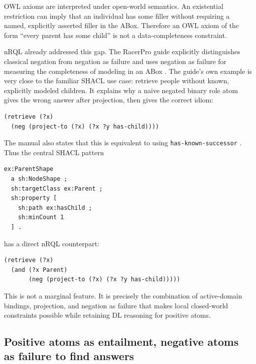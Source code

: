 \documentclass[11pt,letterpaper]{article}
\newcommand{\nrql}{nRQL}
\newcommand{\shacl}{SHACL}
\newcommand{\naf}{negation as failure}
\newcommand{\abox}{ABox}
\newcommand{\owl}{OWL}
\begin{document}
\owl{} axioms are interpreted under open-world semantics. An existential restriction can imply that an individual has some filler without requiring a named, explicitly asserted filler in the \abox{}. Therefore an \owl{} axiom of the form ``every parent has some child'' is not a data-completeness constraint.

\nrql{} already addressed this gap. The RacerPro guide explicitly distinguishes classical negation from \naf{} and uses \naf{} for measuring the completeness of modeling in an \abox{} \cite[pp.~113--116]{racerug}. The guide's own example is very close to the familiar \shacl{} use case: retrieve people without known, explicitly modeled children. It explains why a naive negated binary role atom gives the wrong answer after projection, then gives the correct idiom:

\begin{lstlisting}[language=nrql,caption={nRQL idiom for missing known successors.}]
(retrieve (?x)
  (neg (project-to (?x) (?x ?y has-child))))
\end{lstlisting}

The manual also states that this is equivalent to using \texttt{has-known-successor} \cite[pp.~115--116,119--120]{racerug}. Thus the central \shacl{} pattern

\begin{lstlisting}[language=turtle,caption={SHACL idiom for the same missing-successor constraint.}]
ex:ParentShape
  a sh:NodeShape ;
  sh:targetClass ex:Parent ;
  sh:property [
    sh:path ex:hasChild ;
    sh:minCount 1
  ] .
\end{lstlisting}

has a direct \nrql{} counterpart:

\begin{lstlisting}[language=nrql,caption={nRQL violation query for the parent example.}]
(retrieve (?x)
  (and (?x Parent)
       (neg (project-to (?x) (?x ?y has-child)))))
\end{lstlisting}

This is not a marginal feature. It is precisely the combination of active-domain bindings, projection, and \naf{} that makes local closed-world constraints possible while retaining DL reasoning for positive atoms.

\subsection{Positive atoms as entailment, negative atoms as failure to find answers}
\end{document}
